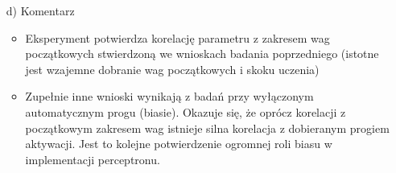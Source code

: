 \documentclass[17pt]{article}
\begin{document}
\begin{enumerate}
\item[d)] Komentarz


\begin{itemize}
\item Eksperyment potwierdza korelację parametru z zakresem wag początkowych stwierdzoną we wnioskach badania poprzedniego (istotne jest wzajemne dobranie wag początkowych i skoku uczenia)
\item Zupełnie inne wnioski wynikają z badań przy wyłączonym automatycznym progu (biasie). Okazuje się, że oprócz korelacji z początkowym zakresem wag istnieje silna korelacja z dobieranym progiem aktywacji. Jest to kolejne potwierdzenie ogromnej roli biasu w implementacji perceptronu.
\end{itemize}


\end{enumerate}
\end{document}
